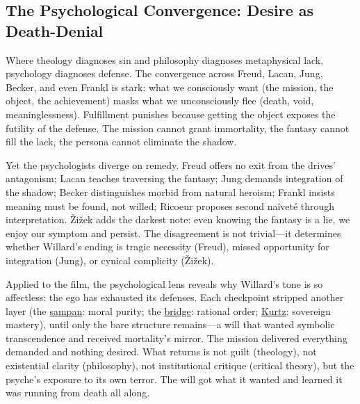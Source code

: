 \subsection*{The Psychological Convergence: Desire as Death-Denial}
\label{ssec:vi-synthesis}

Where theology diagnoses sin and philosophy diagnoses metaphysical lack, psychology diagnoses
defense. The convergence across Freud, Lacan, Jung, Becker, and even Frankl is stark: what we
consciously want (the mission, the object, the achievement) masks what we unconsciously flee
(death, void, meaninglessness). Fulfillment punishes because getting the object exposes the
futility of the defense. The mission cannot grant immortality, the fantasy cannot fill the
lack, the persona cannot eliminate the shadow.

Yet the psychologists diverge on remedy. Freud offers no exit from the drives' antagonism;
Lacan teaches traversing the fantasy; Jung demands integration of the shadow; Becker
distinguishes morbid from natural heroism; Frankl insists meaning must be found, not willed;
Ricoeur proposes second naïveté through interpretation. {\v{Z}}i{\v{z}}ek adds the darkest
note: even knowing the fantasy is a lie, we enjoy our symptom and persist. The disagreement is
not trivial---it determines whether Willard's ending is tragic necessity (Freud), missed
opportunity for integration (Jung), or cynical complicity ({\v{Z}}i{\v{z}}ek).

Applied to the film, the psychological lens reveals why Willard's tone is so affectless: the
ego has exhausted its defenses. Each checkpoint stripped another layer (the
\hyperref[scene:sampan]{sampan}: moral purity; the \hyperref[scene:do-lung-bridge]{bridge}:
rational order; \hyperref[scene:kurtz-compound]{Kurtz}: sovereign mastery), until only the bare
structure remains---a will that wanted symbolic transcendence and received mortality's mirror. The
mission delivered everything demanded and nothing desired. What returns is not guilt
(theology), not existential clarity (philosophy), not institutional critique (critical theory),
but the psyche's exposure to its own terror. The will got what it wanted and learned it was
running from death all along.
